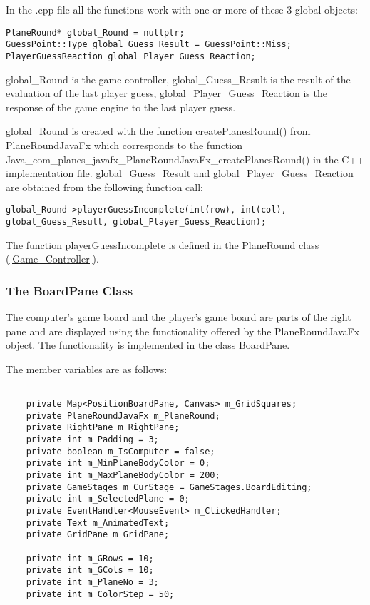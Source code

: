 In the .cpp file all the functions work with one or more of these 3 global objects:

\begin{lstlisting}
PlaneRound* global_Round = nullptr;
GuessPoint::Type global_Guess_Result = GuessPoint::Miss;
PlayerGuessReaction global_Player_Guess_Reaction;
\end{lstlisting}

global\_Round is the game controller, global\_Guess\_Result is the result of the evaluation of the last player guess, global\_Player\_Guess\_Reaction is the response of the game engine to the last player guess. 

global\_Round is created with the function createPlanesRound() from PlaneRoundJavaFx which corresponds to the function\\ Java\_com\_planes\_javafx\_PlaneRoundJavaFx\_createPlanesRound() in the C++ implementation file. global\_Guess\_Result and global\_Player\_Guess\_Reaction are obtained from the following function call:

\begin{lstlisting}
global_Round->playerGuessIncomplete(int(row), int(col), global_Guess_Result, global_Player_Guess_Reaction);
\end{lstlisting}

The function playerGuessIncomplete is defined in the PlaneRound class (\ref{Game_Controller}).

\subsubsection {The BoardPane Class}

The computer's game board and the player's game board are parts of the right pane and are displayed using the functionality offered by the PlaneRoundJavaFx object. The functionality is implemented in the class BoardPane.

The member variables are as follows:

\begin{lstlisting}

	private Map<PositionBoardPane, Canvas> m_GridSquares;
	private PlaneRoundJavaFx m_PlaneRound;
	private RightPane m_RightPane;
	private int m_Padding = 3;
	private boolean m_IsComputer = false;
	private int m_MinPlaneBodyColor = 0;
	private int m_MaxPlaneBodyColor = 200;	
	private GameStages m_CurStage = GameStages.BoardEditing;
	private int m_SelectedPlane = 0;
	private EventHandler<MouseEvent> m_ClickedHandler;
	private Text m_AnimatedText;
	private GridPane m_GridPane;

	private int m_GRows = 10;
	private int m_GCols = 10;
	private int m_PlaneNo = 3;
	private int m_ColorStep = 50;

\end{lstlisting}

